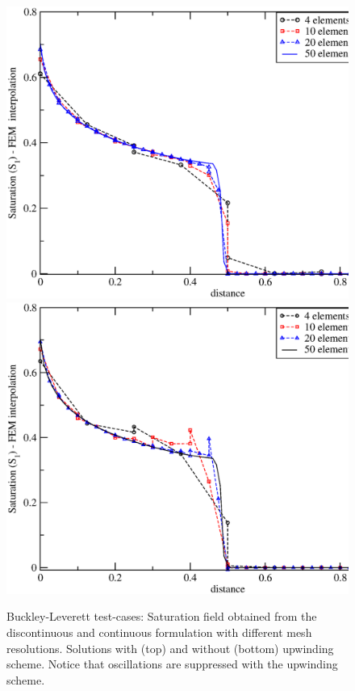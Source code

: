 \begin{figure}[h]
\vbox{
\hbox{\hspace{.3cm}\includegraphics[width=.9\textwidth]{./diagrams/bl-dg-4-10-20}}
\vspace{-0.cm}
\hbox{\hspace{.3cm}\includegraphics[width=.9\textwidth]{./diagrams/bl-dg-cent-4-10-20}}}
\caption{Buckley-Leverett test-cases: Saturation field obtained from the discontinuous and continuous formulation with different mesh resolutions. Solutions with (top) and without (bottom) upwinding scheme. Notice that oscillations are suppressed with the upwinding scheme.\label{bl-dg-cent-4-10-20}}
\end{figure}


